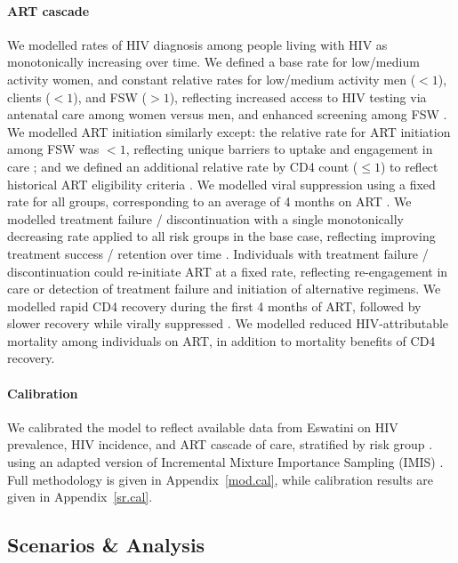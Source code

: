 \paragraph{ART cascade}
We modelled rates of HIV diagnosis among people living with HIV as monotonically increasing over time.
We defined a base rate for low/medium activity women,
and constant relative rates for low/medium activity men ($<1$), clients ($<1$), and FSW ($>1$),
reflecting increased access to HIV testing via antenatal care among women versus men,
and enhanced screening among FSW \cite{Baral2014}.
We modelled ART initiation similarly except:
the relative rate for ART initiation among FSW was $<1$,
reflecting unique barriers to uptake and engagement in care \cite{Mountain2014sr}; and
we defined an additional relative rate by CD4 count ($\le1$)
to reflect historical ART eligibility criteria \cite{NERCHA2018rep}.
We modelled viral suppression using a fixed rate for all groups,
corresponding to an average of 4 months on ART \cite{Mujugira2016}.
We modelled treatment failure / discontinuation with a single monotonically decreasing rate
applied to all risk groups in the base case,
reflecting improving treatment success / retention over time \cite{NERCHA2014nsf}.
Individuals with treatment failure / discontinuation could re-initiate ART at a fixed rate,
reflecting re-engagement in care or detection of treatment failure and initiation of alternative regimens.
We modelled rapid CD4 recovery during the first 4 months of ART,
followed by slower recovery while virally suppressed \cite{Battegay2006,Lawn2006,Gabillard2013}.
We modelled reduced HIV-attributable mortality among individuals on ART,
in addition to mortality benefits of CD4 recovery.
\paragraph{Calibration}
We calibrated the model to reflect
available data from Eswatini on HIV prevalence, HIV incidence, and ART cascade of care,
stratified by risk group \cite{SDHS2006,SHIMS1,SHIMS2,SHIMS3,Baral2014,EswKP2014,EswIBBS2022}.
using an adapted version of Incremental Mixture Importance Sampling (IMIS) \cite{Raftery2010}.
Full methodology is given in Appendix~\ref{mod.cal},
while calibration results are given in Appendix~\ref{sr.cal}.
\subsection{Scenarios \& Analysis}\label{art.meth.obj}
